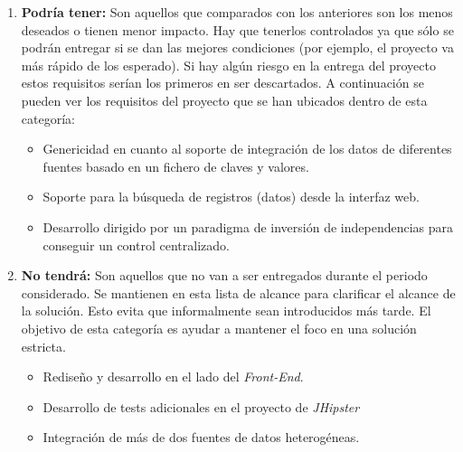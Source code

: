 \begin{enumerate}
\item \textbf{Podría tener:} Son aquellos que comparados con los anteriores son los menos deseados o tienen menor impacto. Hay que tenerlos controlados ya que sólo se podrán entregar si se dan las mejores condiciones (por ejemplo, el proyecto va más rápido de los esperado). Si hay algún riesgo en la entrega del proyecto estos requisitos serían los primeros en ser descartados. A continuación se pueden ver los requisitos del proyecto que se han ubicados dentro de esta categoría:

\begin{itemize}
\item Genericidad en cuanto al soporte de integración de los datos de diferentes fuentes basado en un fichero de claves y valores. 
\item Soporte para la búsqueda de registros (datos) desde la interfaz web. 
\item Desarrollo dirigido por un paradigma de inversión de independencias para conseguir un control centralizado.
\end{itemize}

\item \textbf{No tendrá:} Son aquellos que no van a ser entregados durante el periodo considerado. Se mantienen en esta lista de alcance para clarificar el alcance de la solución. Esto evita que informalmente sean introducidos más tarde. El objetivo de esta categoría es ayudar a mantener el foco en una solución estricta. 


\begin{itemize}
\item Rediseño y desarrollo en el lado del \textit{Front-End}.
\item Desarrollo de tests adicionales en el proyecto de \textit{JHipster}
\item Integración de más de dos fuentes de datos heterogéneas. 
\end{itemize}


\end{enumerate}



